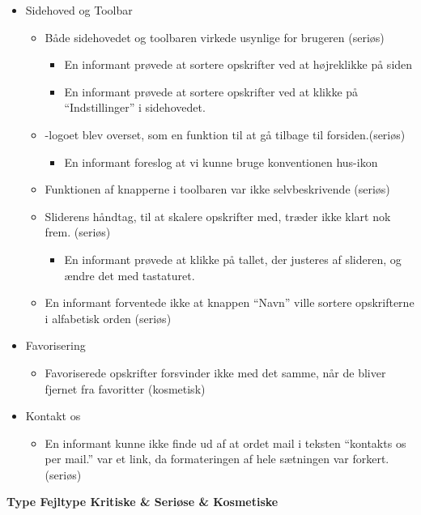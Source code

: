 \begin{itemize}[noitemsep]
\begin{itemize}[noitemsep]
  \end{itemize}
 \item Sidehoved og Toolbar
  \begin{itemize}[noitemsep]
  \item Både sidehovedet og toolbaren virkede usynlige for brugeren (seriøs)
   \begin{itemize}[noitemsep]
   \item En informant prøvede at sortere opskrifter ved at højreklikke på siden
   \item En informant prøvede at sortere opskrifter ved at klikke på ``Indstillinger'' i sidehovedet.
   \end{itemize}
  \item \Foodl-logoet blev overset, som en funktion til at gå tilbage til forsiden.(seriøs)
   \begin{itemize}[noitemsep]
   \item En informant foreslog at vi kunne bruge konventionen hus-ikon
   \end{itemize}
  \item Funktionen af knapperne i toolbaren var ikke selvbeskrivende (seriøs)
  \item Sliderens håndtag, til at skalere opskrifter med, træder ikke klart nok frem. (seriøs)
   \begin{itemize}[noitemsep]
   \item En informant prøvede at klikke på tallet, der justeres af slideren, og ændre det med tastaturet.
   \end{itemize}
  \item En informant forventede ikke at knappen ``Navn'' ville sortere opskrifterne i alfabetisk orden (seriøs)
  \end{itemize}
 \item Favorisering
  \begin{itemize}[noitemsep]
  \item Favoriserede opskrifter forsvinder ikke med det samme, når de bliver fjernet fra favoritter (kosmetisk)
  \end{itemize}
 \item Kontakt os
  \begin{itemize}[noitemsep]
  \item En informant kunne ikke finde ud af at ordet mail i teksten ``kontakts os per mail.'' var et link, da formateringen af hele sætningen var forkert. (seriøs)
  \end{itemize}
\end{itemize}


\textbf{
           						 {Type}
       {Fejltype             	}{Kritiske   & Seriøse   & Kosmetiske}{
}
}
